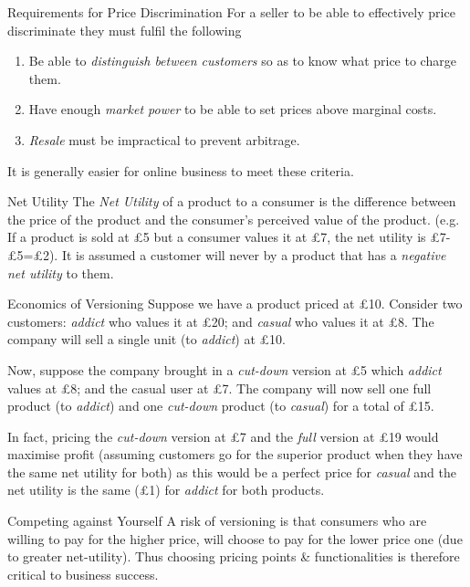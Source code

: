 \documentclass[11pt,a4paper]{article}
\begin{document}
\begin{proposition}{Requirements for Price Discrimination}
  For a seller to be able to effectively price discriminate they must fulfil the following
  \begin{enumerate}
    \item Be able to \textit{distinguish between customers} so as to know what price to charge them.
    \item Have enough \textit{market power} to be able to set prices above marginal costs.
    \item \textit{Resale} must be impractical to prevent arbitrage.
  \end{enumerate}
  It is generally easier for online business to meet these criteria.
\end{proposition}

\begin{definition}{Net Utility}
  The \textit{Net Utility} of a product to a consumer is the difference between the price of the product and the consumer's perceived value of the product. (e.g. If a product is sold at £5 but a consumer values it at £7, the net utility is £7-£5=£2). It is assumed a customer will never by a product that has a \textit{negative net utility} to them.
\end{definition}

\begin{example}{Economics of Versioning}
  Suppose we have a product priced at £10. Consider two customers: \textit{addict} who values it at £20; and \textit{casual} who values it at £8. The company will sell a single unit (to \textit{addict}) at £10.
  \par Now, suppose the company brought in a \textit{cut-down} version at £5 which \textit{addict} values at £8; and the casual user at £7. The company will now sell one full product (to \textit{addict}) and one \textit{cut-down} product (to \textit{casual}) for a total of £15.
  \par In fact, pricing the \textit{cut-down} version at £7 and the \textit{full} version at £19 would maximise profit (assuming customers go for the superior product when they have the same net utility for both) as this would be a perfect price for  \textit{casual} and the net utility is the same (£1) for \textit{addict} for both products.
\end{example}

\begin{proposition}{Competing against Yourself}
  A risk of versioning is that consumers who are willing to pay for the higher price, will choose to pay for the lower price one (due to greater net-utility). Thus choosing pricing points \& functionalities is therefore critical to business success.
\end{proposition}
\end{document}
